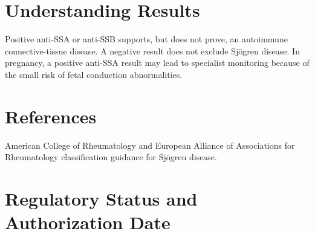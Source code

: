 \section*{Understanding Results}
Positive anti-SSA or anti-SSB supports, but does not prove, an autoimmune connective-tissue disease. A negative result does not exclude Sjögren disease. In pregnancy, a positive anti-SSA result may lead to specialist monitoring because of the small risk of fetal conduction abnormalities.

\section*{References}
American College of Rheumatology and European Alliance of Associations for Rheumatology classification guidance for Sjögren disease.

\clearpage


\section*{Regulatory Status and Authorization Date}

\clearpage
